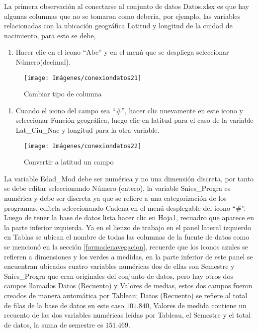 \documentclass[
]{book}
\providecommand{\tightlist}{%
  \setlength{\itemsep}{0pt}\setlength{\parskip}{0pt}}
\begin{document}
La primera observación al conectarse al conjunto de datos Datos.xlsx es que hay algunas columnas que no se tomaron como debería, por ejemplo, las variables relacionadas con la ubicación geográfica Latitud y longitud de la cuidad de nacimiento, para esto se debe,

\begin{enumerate}
\def\labelenumi{\arabic{enumi}.}
\tightlist
\item
  Hacer clic en el icono ``Abc'' y en el menú que se despliega seleccionar Número(decimal).
\end{enumerate}

\begin{figure}

{\centering \texttt{[image: Imágenes/conexiondatos21]} 

}

\caption{Cambiar tipo de columna}\label{fig:geograficas-fig}
\end{figure}

\begin{enumerate}
\def\labelenumi{\arabic{enumi}.}
\setcounter{enumi}{1}
\tightlist
\item
  Cuando el icono del campo sea ``\#'', hacer clic nuevamente en este icono y seleccionar Función geográfica, luego clic en latitud para el caso de la variable Lat\_Ciu\_Nac y longitud para la otra variable.
\end{enumerate}

\begin{figure}

{\centering \texttt{[image: Imágenes/conexiondatos22]} 

}

\caption{Convertir a latitud un campo}\label{fig:geograficolatitud-fig}
\end{figure}

La variable Edad\_Mod debe ser numérica y no una dimensión discreta, por tanto se debe editar seleccionando Número (entero), la variable Snies\_Progra es numérica y debe ser discreta ya que se refiere a una categorización de los programas, edítela seleccionando Cadena en el menú desplegable del icono ``\#''. Luego de tener la base de datos lista hacer clic en Hoja1, recuadro que aparece en la parte inferior izquierda. Ya en el lienzo de trabajo en el panel lateral izquierdo en Tablas se ubican el nombre de todas las columnas de la fuente de datos como se mencionó en la sección \ref{formadenavegacion}, recuerde que los iconos azules se refieren a dimensiones y los verdes a medidas, en la parte inferior de este panel se encuentran ubicados cuatro variables numéricas dos de ellas son Semestre y Snies\_Progra que eran originales del conjunto de datos, pero hay otros dos campos llamados Datos (Recuento) y Valores de medias, estos dos campos fueron creados de manera automática por Tableau; Datos (Recuento) se refiere al total de filas de la base de datos en este caso \(101.840\), Valores de medida contiene un recuento de las dos variables numéricas leídas por Tableau, el Semestre y el total de datos, la suma de semestre es \(151.469\).
\end{document}
